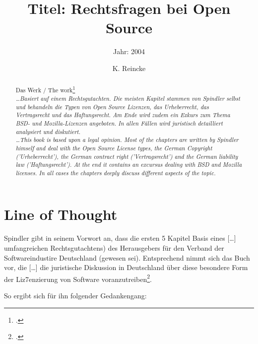 \documentclass[DIV=calc,BCOR=5mm,11pt,headings=small,oneside,abstract=true, toc=bib]{scrartcl}
\begin{document}

\titlehead{Literaturexzerpt}
\subject{Autor(en): Spindler}
\title{Titel: Rechtsfragen bei Open Source}
\subtitle{Jahr: 2004 }
\author{K. Reincke}

\maketitle

\begin{abstract}
\noindent
Das Werk / The work\footcite[][]{Spindler2004a} \\
\noindent \itshape
\ldots Basiert auf einem Rechtsgutachten. Die meisten Kapitel stammen von
Spindler selbst und behandeln die Typen von Open Source Lizenzen, das
Urheberrecht, das Vertragsrecht und das Haftungsrecht. Am Ende wird zudem ein
Exkurs zum Thema BSD- und Mozilla-Lizenzen angeboten. In allen Fällen wird
juristisch detailliert analysiert und diskutiert. \\
\noindent
\ldots This book is based upon a legal opinion. Most of the chapters are written
by Spindler himself and deal with the Open Source License types, the German
Copyright ('Urheberrecht'), the German contract right ('Vertragsrecht') and the
German liability law ('Haftungsrecht'). At the end it contains an excursus
dealing with BSD and Mozilla licenses. In all cases the chapters deeply discuss
different aspects of the topic.
\end{abstract}
\footnotesize
\normalsize

\section{Line of Thought}

Spindler gibt in seinem Vorwort an, dass die ersten 5 Kapitel Basis eines
\glqq{}[\ldots] umfangreichen Rechtsgutachtens) des Herausgebers für den Verband
der Softwareindustire Deutschland (gewesen sei)\grqq{}. Entsprechend nimmt sich
das Buch vor, die \glqq{}[\ldots] die juristische Diskussion in Deutschland über
diese besondere Form der Liz7enzierung von Software
voranzutreiben\grqq{}\footcite[vgl.][V]{Spindler2004a}.

So ergibt sich für ihn folgender Gedankengang:
\end{document}
